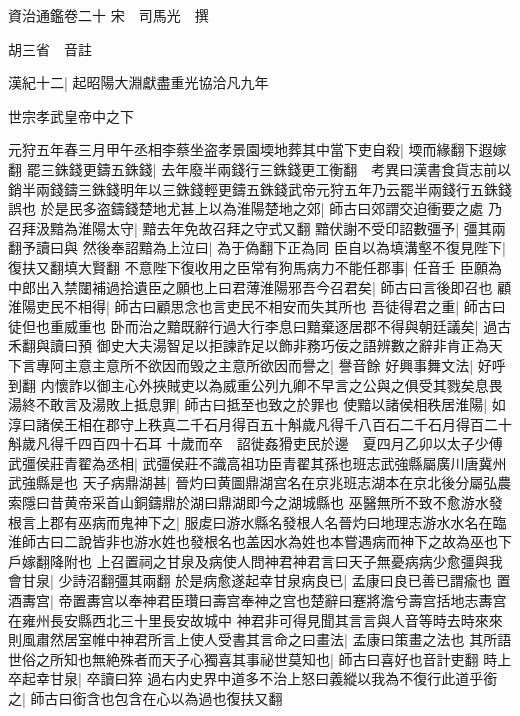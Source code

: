 資治通鑑卷二十
宋　司馬光　撰

胡三省　音註

漢紀十二|{
	起昭陽大淵獻盡重光協洽凡九年}


世宗孝武皇帝中之下

元狩五年春三月甲午丞相李蔡坐盗孝景園堧地葬其中當下吏自殺|{
	堧而緣翻下遐嫁翻}
罷三銖錢更鑄五銖錢|{
	去年廢半兩錢行三銖錢更工衡翻　考異曰漢書食貨志前以銷半兩錢鑄三銖錢明年以三銖錢輕更鑄五銖錢武帝元狩五年乃云罷半兩錢行五銖錢誤也}
於是民多盗鑄錢楚地尤甚上以為淮陽楚地之郊|{
	師古曰郊謂交迫衝要之處}
乃召拜汲黯為淮陽太守|{
	黯去年免故召拜之守式又翻}
黯伏謝不受印詔數彊予|{
	彊其兩翻予讀曰與}
然後奉詔黯為上泣曰|{
	為于偽翻下正為同}
臣自以為填溝壑不復見陛下|{
	復扶又翻填大賢翻}
不意陛下復收用之臣常有狗馬病力不能任郡事|{
	任音壬}
臣願為中郎出入禁闥補過拾遺臣之願也上曰君薄淮陽邪吾今召君矣|{
	師古曰言後即召也}
顧淮陽吏民不相得|{
	師古曰顧思念也言吏民不相安而失其所也}
吾徒得君之重|{
	師古曰徒但也重威重也}
卧而治之黯既辭行過大行李息曰黯棄逐居郡不得與朝廷議矣|{
	過古禾翻與讀曰預}
御史大夫湯智足以拒諫詐足以飾非務巧佞之語辨數之辭非肯正為天下言專阿主意主意所不欲因而毁之主意所欲因而譽之|{
	譽音餘}
好興事舞文法|{
	好呼到翻}
内懷詐以御主心外挾賊吏以為威重公列九卿不早言之公與之俱受其戮矣息畏湯終不敢言及湯敗上抵息罪|{
	師古曰抵至也致之於罪也}
使黯以諸侯相秩居淮陽|{
	如淳曰諸侯王相在郡守上秩真二千石月得百五十斛歲凡得千八百石二千石月得百二十斛歲凡得千四百四十石耳}
十歲而卒　詔徙姦猾吏民於邊　夏四月乙卯以太子少傅武彊侯莊青翟為丞相|{
	武彊侯莊不識高祖功臣青翟其孫也班志武強縣屬廣川唐冀州武強縣是也}
天子病鼎湖甚|{
	晉灼曰黄圖鼎湖宫名在京兆班志湖本在京北後分屬弘農索隱曰昔黄帝采首山銅鑄鼎於湖曰鼎湖即今之湖城縣也}
巫醫無所不致不愈游水發根言上郡有巫病而鬼神下之|{
	服䖍曰游水縣名發根人名晉灼曰地理志游水水名在臨淮師古曰二說皆非也游水姓也發根名也盖因水為姓也本嘗遇病而神下之故為巫也下戶嫁翻降附也}
上召置祠之甘泉及病使人問神君神君言曰天子無憂病病少愈彊與我會甘泉|{
	少詩沼翻彊其兩翻}
於是病愈遂起幸甘泉病良已|{
	孟康曰良已善已謂瘉也}
置酒夀宫|{
	帝置夀宫以奉神君臣瓚曰壽宫奉神之宫也楚辭曰蹇將澹兮壽宫括地志夀宫在雍州長安縣西北三十里長安故城中}
神君非可得見聞其言言與人音等時去時來來則風肅然居室帷中神君所言上使人受書其言命之曰畫法|{
	孟康曰策畫之法也}
其所語世俗之所知也無絶殊者而天子心獨喜其事祕世莫知也|{
	師古曰喜好也音計吏翻}
時上卒起幸甘泉|{
	卒讀曰猝}
過右内史界中道多不治上怒曰義縱以我為不復行此道乎銜之|{
	師古曰銜含也包含在心以為過也復扶又翻}



